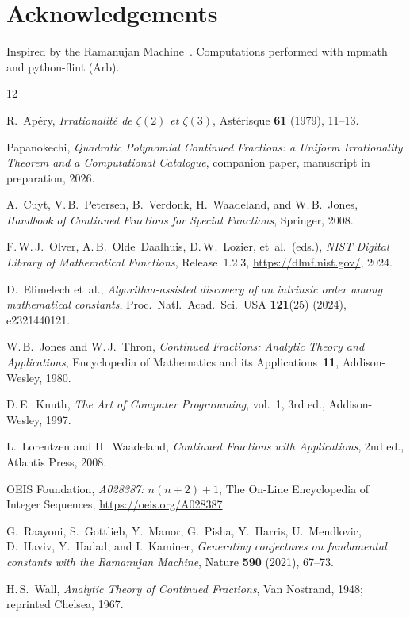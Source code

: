 \documentclass[11pt,a4paper]{article}
\theoremstyle{plain}
\theoremstyle{definition}
\theoremstyle{remark}
\begin{document}
\section*{Acknowledgements}

Inspired by the Ramanujan Machine~\cite{raayoni2021,elimelech2024}.
Computations performed with mpmath and python-flint (Arb).

\begin{thebibliography}{12}

R.~Ap\'ery,
\textit{Irrationalit\'e de $\zeta(2)$ et $\zeta(3)$},
Ast\'erisque \textbf{61} (1979), 11--13.

Papanokechi,
\textit{Quadratic Polynomial Continued Fractions: a Uniform
Irrationality Theorem and a Computational Catalogue},
companion paper, manuscript in preparation, 2026.

A.~Cuyt, V.\,B.~Petersen, B.~Verdonk, H.~Waadeland,
and W.\,B.~Jones,
\emph{Handbook of Continued Fractions for Special Functions},
Springer, 2008.

F.\,W.\,J.~Olver, A.\,B.~Olde~Daalhuis, D.\,W.~Lozier,
et~al.\ (eds.),
\emph{NIST Digital Library of Mathematical Functions},
Release~1.2.3, \url{https://dlmf.nist.gov/}, 2024.

D.~Elimelech et~al.,
\textit{Algorithm-assisted discovery of an intrinsic order among
mathematical constants},
Proc.\ Natl.\ Acad.\ Sci.\ USA \textbf{121}(25) (2024),
e2321440121.

W.\,B.~Jones and W.\,J.~Thron,
\emph{Continued Fractions: Analytic Theory and Applications},
Encyclopedia of Mathematics and its Applications~\textbf{11},
Addison-Wesley, 1980.

D.\,E.~Knuth,
\emph{The Art of Computer Programming},
vol.~1, 3rd ed., Addison-Wesley, 1997.

L.~Lorentzen and H.~Waadeland,
\emph{Continued Fractions with Applications},
2nd ed., Atlantis Press, 2008.

OEIS Foundation,
\textit{A028387: $n(n{+}2)+1$},
The On-Line Encyclopedia of Integer Sequences,
\url{https://oeis.org/A028387}.

G.~Raayoni, S.~Gottlieb, Y.~Manor, G.~Pisha, Y.~Harris,
U.~Mendlovic, D.~Haviv, Y.~Hadad, and I.~Kaminer,
\textit{Generating conjectures on fundamental constants with the
Ramanujan Machine},
Nature \textbf{590} (2021), 67--73.

H.\,S.~Wall,
\emph{Analytic Theory of Continued Fractions},
Van Nostrand, 1948; reprinted Chelsea, 1967.

\end{thebibliography}
\end{document}
